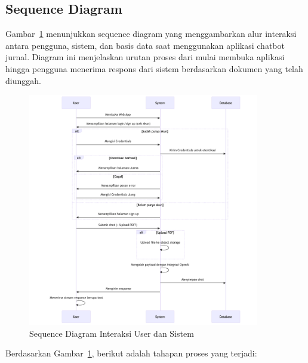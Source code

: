 \subsection{Sequence Diagram}

Gambar~\ref{fig:sequence-login-chat} menunjukkan sequence diagram yang menggambarkan alur interaksi antara pengguna, sistem, dan basis data saat menggunakan aplikasi chatbot jurnal. Diagram ini menjelaskan urutan proses dari mulai membuka aplikasi hingga pengguna menerima respons dari sistem berdasarkan dokumen yang telah diunggah.

\begin{figure}[H]
    \centering
    \includegraphics[width=0.9\textwidth]{images/bab-3/sequence.png}
    \caption{Sequence Diagram Interaksi User dan Sistem}
    \label{fig:sequence-login-chat}
\end{figure}

Berdasarkan Gambar~\ref{fig:sequence-login-chat}, berikut adalah tahapan proses yang terjadi:

